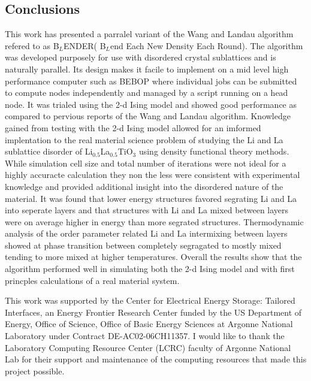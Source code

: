\documentclass[aps,prl,reprint,superscriptaddress,showkeys]{revtex4-1}
\begin{document}
\subsection{Conclusions}
 This work has presented a parralel variant of the Wang and Landau algorithm refered to as B$_L$ENDER( B$_L$end Each New Density Each Round). The algorithm was developed purposely for use with disordered crystal sublattices and is naturally parallel. Its design makes it facile to implement on a mid level high performance computer such as BEBOP where individual jobs can be submitted to compute nodes independently and managed by a script running on a head node. It was trialed using the 2-d Ising model and showed good performance as compared to pervious reports of the Wang and Landau algorithm. Knowledge gained from testing with the 2-d Ising model allowed for an imformed implentation to the real material science problem of studying the Li and La sublattice disorder of Li$_{0.5}$La$_{0.5}$TiO$_{3}$ using density functional theory methods. While simulation cell size and total number of iterations were not ideal for a highly accuracte calculation they non the less were consistent with experimental knowledge and provided additional insight into the disordered nature of the material. It was found that lower energy structures favored segrating Li and La into seperate layers and that structures with Li and La mixed between layers were on average higher in energy than more segrated structures. Thermodynamic analysis of the order parameter related Li and La intermixing between layers showed at phase transition between completely segragated  to mostly mixed tending to more mixed at higher temperatures. Overall the results show that the algorithm performed well in simulating both the 2-d Ising model and with first princples calculations of a real material system. 

\begin{acknowledgments}
This work was supported by the Center for Electrical Energy Storage: Tailored Interfaces, an Energy Frontier Research Center funded 
by the US Department of Energy, Office of Science, Office of Basic Energy Sciences at Argonne National Laboratory under Contract DE-AC02-06CH11357.
I would like to thank the Laboratory Computing Resource Center (LCRC) faculty of Argonne National Lab for their support and maintenance of the computing resources that made this project possible. 
\end{acknowledgments}


\end{document}
